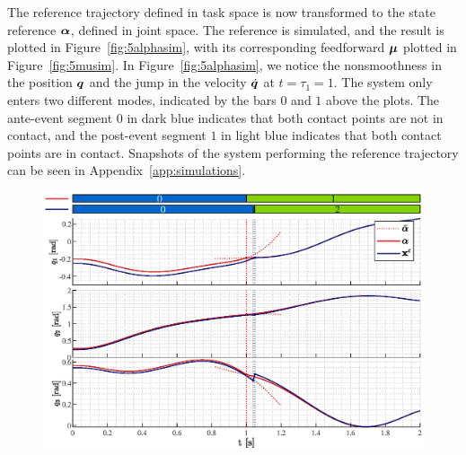 \documentclass[../DC2019003Bouma.tex]{subfiles}
\begin{document}
The reference trajectory defined in task space is now transformed to the state reference $\boldsymbol{\alpha}$, defined in joint space. The reference is simulated, and the result is plotted in Figure~\ref{fig:5alphasim}, with its corresponding feedforward $\boldsymbol{\mu}$ plotted in Figure~\ref{fig:5musim}. In Figure~\ref{fig:5alphasim}, we notice the nonsmoothness in the position ${\boldsymbol{q}}$ and the jump in the velocity $\dot{{\boldsymbol{q}}}$ at $t=\tau_1=1$. The system only enters two different modes, indicated by the bars $0$ and $1$ above the plots. The ante-event segment $0$ in dark blue indicates that both contact points are not in contact, and the post-event segment $1$ in light blue indicates that both contact points are in contact. Snapshots of the system performing the reference trajectory can be seen in Appendix~\ref{app:simulations}.
\begin{figure}[bt!]
\centering
\begin{minipage}[c]{\textwidth}
\centering
\includegraphics[width=\textwidth]{alphaxpos.eps}
\end{minipage}


\end{figure}
\end{document}
